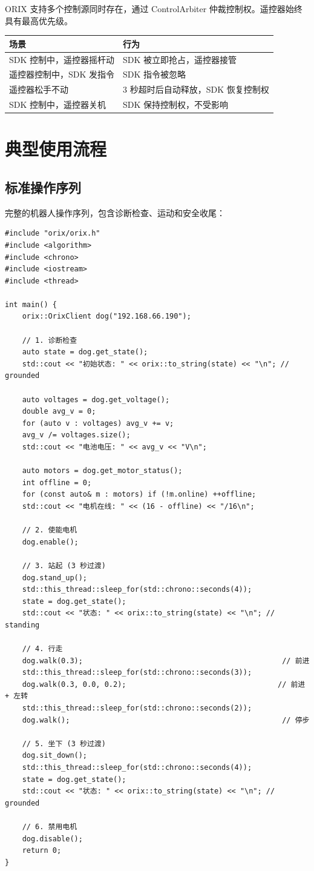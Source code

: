 \documentclass[a4paper,11pt,openany]{book}
\begin{document}
ORIX 支持多个控制源同时存在，通过 ControlArbiter 仲裁控制权。遥控器始终具有最高优先级。

\begin{longtable}{ll}
\toprule
场景 & 行为 \\
\midrule
\endhead
SDK 控制中，遥控器摇杆动 & SDK 被立即抢占，遥控器接管 \\
遥控器控制中，SDK 发指令 & SDK 指令被忽略 \\
遥控器松手不动 & 3 秒超时后自动释放，SDK 恢复控制权 \\
SDK 控制中，遥控器关机 & SDK 保持控制权，不受影响 \\
\bottomrule
\end{longtable}

\section{典型使用流程}

\subsection{标准操作序列}

完整的机器人操作序列，包含诊断检查、运动和安全收尾：

\begin{lstlisting}[style=cpp]
#include "orix/orix.h"
#include <algorithm>
#include <chrono>
#include <iostream>
#include <thread>

int main() {
    orix::OrixClient dog("192.168.66.190");

    // 1. 诊断检查
    auto state = dog.get_state();
    std::cout << "初始状态: " << orix::to_string(state) << "\n"; // grounded

    auto voltages = dog.get_voltage();
    double avg_v = 0;
    for (auto v : voltages) avg_v += v;
    avg_v /= voltages.size();
    std::cout << "电池电压: " << avg_v << "V\n";

    auto motors = dog.get_motor_status();
    int offline = 0;
    for (const auto& m : motors) if (!m.online) ++offline;
    std::cout << "电机在线: " << (16 - offline) << "/16\n";

    // 2. 使能电机
    dog.enable();

    // 3. 站起 (3 秒过渡)
    dog.stand_up();
    std::this_thread::sleep_for(std::chrono::seconds(4));
    state = dog.get_state();
    std::cout << "状态: " << orix::to_string(state) << "\n"; // standing

    // 4. 行走
    dog.walk(0.3);                                              // 前进
    std::this_thread::sleep_for(std::chrono::seconds(3));
    dog.walk(0.3, 0.0, 0.2);                                   // 前进 + 左转
    std::this_thread::sleep_for(std::chrono::seconds(2));
    dog.walk();                                                 // 停步

    // 5. 坐下 (3 秒过渡)
    dog.sit_down();
    std::this_thread::sleep_for(std::chrono::seconds(4));
    state = dog.get_state();
    std::cout << "状态: " << orix::to_string(state) << "\n"; // grounded

    // 6. 禁用电机
    dog.disable();
    return 0;
}
\end{lstlisting}
\end{document}
